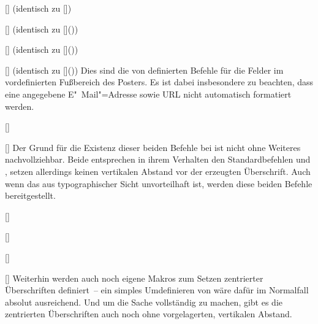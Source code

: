 \begin{DeclareEntity}{}
\begin{Declaration}
  {[]}
  (identisch zu [])
\begin{Declaration}
  {[]}
  (identisch zu []())
\begin{Declaration}
  {[]}
  (identisch zu []())
\begin{Declaration}
  {[]}
  (identisch zu []())
\printdeclarationlist
%
Dies sind die von  definierten Befehle für die Felder im 
vordefinierten Fußbereich des Posters. Es ist dabei insbesondere zu beachten, 
dass eine angegebene E"~Mail"=Adresse sowie URL nicht automatisch formatiert 
werden.
\end{Declaration}
\end{Declaration}
\end{Declaration}
\end{Declaration}

\begin{Declaration}
  {[]}
\begin{Declaration}
  {[]}
\printdeclarationlist
%
Der Grund für die Existenz dieser beiden Befehle bei  ist 
nicht ohne Weiteres nachvollziehbar. Beide entsprechen in ihrem Verhalten den 
Standardbefehlen  und , setzen allerdings 
keinen vertikalen Abstand vor der erzeugten Überschrift. Auch wenn das aus 
typographischer Sicht unvorteilhaft ist, werden diese beiden Befehle 
bereitgestellt.
\end{Declaration}
\end{Declaration}

\begin{Declaration}
  {[]}
\begin{Declaration}
  {[]}
\begin{Declaration}
  {[]}
\begin{Declaration}
  {[]}
\printdeclarationlist
%
Weiterhin werden auch noch eigene Makros zum Setzen zentrierter Überschriften 
definiert~-- ein simples Umdefinieren von  wäre dafür im 
Normalfall absolut ausreichend. Und um die Sache vollständig zu machen, gibt es 
die zentrierten Überschriften auch noch ohne vorgelagerten, vertikalen Abstand.
\end{Declaration}
\end{Declaration}
\end{Declaration}
\end{Declaration}


\end{DeclareEntity}
